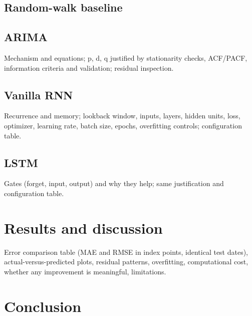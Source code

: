 \documentclass[11pt,a4paper]{article}
\begin{document}
\subsection{Random-walk baseline}
\subsection{ARIMA}
Mechanism and equations; p, d, q justified by stationarity checks, ACF/PACF, information criteria and
validation; residual inspection.
\subsection{Vanilla RNN}
Recurrence and memory; lookback window, inputs, layers, hidden units, loss, optimizer, learning rate,
batch size, epochs, overfitting controls; configuration table.
\subsection{LSTM}
Gates (forget, input, output) and why they help; same justification and configuration table.

\section{Results and discussion}
Error comparison table (MAE and RMSE in index points, identical test dates), actual-versus-predicted
plots, residual patterns, overfitting, computational cost, whether any improvement is meaningful,
limitations.

\section{Conclusion}



\end{document}
